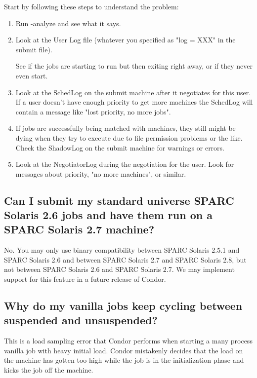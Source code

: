 Start by following these steps to understand the problem:

\begin{enumerate}

\item Run  -analyze and see what it says.

\item Look at the User Log file (whatever you specified as "log = XXX"
in the submit file).

See if the jobs are starting to run but then exiting right away, or if
they never even start.

\item Look at the SchedLog on the submit machine after it negotiates
for this user.
If a user doesn't have enough priority to get more machines the
SchedLog will contain a message like "lost priority, no more jobs".

\item If jobs are successfully being matched with machines, they
still might be dying when they try to execute due to file permission
problems or the like.
Check the ShadowLog on the submit machine for warnings or errors.

\item Look at the NegotiatorLog during the negotiation for the user.
Look for messages about priority, "no more machines", or similar.

\end{enumerate}

\subsection{Can I submit my standard universe SPARC Solaris 2.6 jobs
and have them run on a SPARC Solaris 2.7 machine?}

No. You may only use binary compatibility between SPARC Solaris 2.5.1
and SPARC Solaris 2.6 and between SPARC Solaris 2.7 and SPARC Solaris
2.8, but not between SPARC Solaris 2.6 and SPARC Solaris 2.7.  We may
implement support for this feature in a future release of Condor.

\subsection{Why do my vanilla jobs keep cycling between suspended and
unsuspended?}

This is a load sampling error that Condor performs when starting a many
process vanilla job with heavy initial load.
Condor mistakenly decides that the load on the machine has gotten too
high while the job is in the initialization phase and kicks the job off
the machine.

